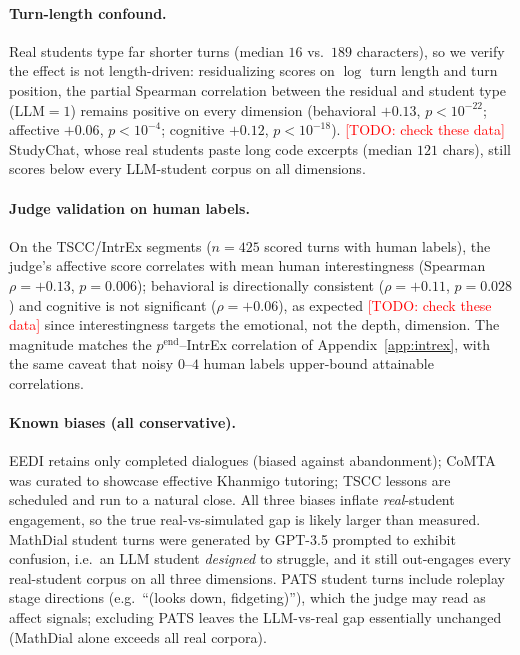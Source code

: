 \documentclass[11pt]{article}
\newcommand{\todo}[1]{\textcolor{red}{[TODO: #1]}}
\begin{document}
\paragraph{Turn-length confound.} Real students type far shorter turns
(median $16$ vs.\ $189$ characters), so we verify the effect is not
length-driven: residualizing scores on $\log$ turn length and turn
position, the partial Spearman correlation between the residual and
student type (LLM${=}1$) remains positive on every dimension
(behavioral $+0.13$, $p<10^{-22}$; affective $+0.06$, $p<10^{-4}$;
cognitive $+0.12$, $p<10^{-18}$). \todo{check these data}
StudyChat, whose real students paste long code excerpts (median $121$ chars), still scores below every
LLM-student corpus on all dimensions.

\paragraph{Judge validation on human labels.} On the TSCC/IntrEx segments
($n{=}425$ scored turns with human labels), the judge's affective score
correlates with mean human interestingness (Spearman $\rho=+0.13$,
$p=0.006$); behavioral is directionally consistent ($\rho=+0.11$,
$p=0.028$) and cognitive is not significant ($\rho=+0.06$), as expected \todo{check these data}
since interestingness targets the emotional, not the depth, dimension.
The magnitude matches the $p^{\text{end}}$--IntrEx correlation of
Appendix~\ref{app:intrex}, with the same caveat that noisy $0$--$4$ human
labels upper-bound attainable correlations.

\paragraph{Known biases (all conservative).} EEDI retains only completed
dialogues (biased against abandonment); CoMTA was curated to showcase
effective Khanmigo tutoring; TSCC lessons are scheduled and run to a
natural close. All three biases inflate \emph{real}-student engagement,
so the true real-vs-simulated gap is likely larger than measured. MathDial
student turns were generated by GPT-3.5 prompted to exhibit confusion,
i.e.\ an LLM student \emph{designed} to struggle, and it still
out-engages every real-student corpus on all three dimensions. PATS
student turns include roleplay stage directions (e.g.\ ``(looks down,
fidgeting)''), which the judge may read as affect signals; excluding PATS
leaves the LLM-vs-real gap essentially unchanged (MathDial alone exceeds
all real corpora).
\end{document}
